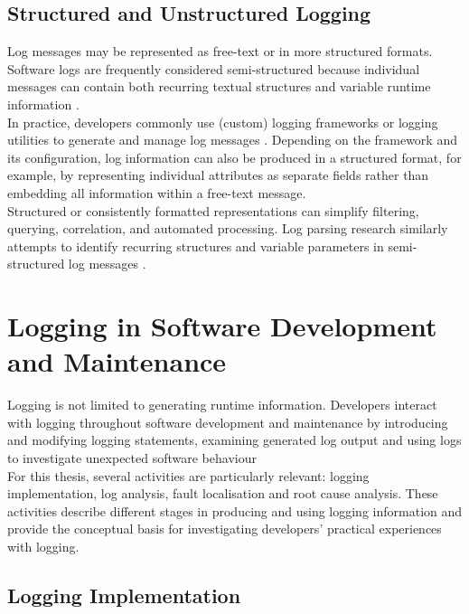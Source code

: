 \subsection{Structured and Unstructured Logging}
\label{subsec:structured_logging}

Log messages may be represented as free-text or in more structured formats. 
Software logs are frequently considered semi-structured because individual messages can contain both recurring textual structures 
and variable runtime information \cite{he2021asurveyonautomatedloganalysis,liu2022uniparser}.
\\
In practice, developers commonly use (custom) logging frameworks or logging utilities to generate and manage log messages \cite{chen2020studyingtheuseofjavaloggingutilities}. 
Depending on the framework and its configuration, log information can also be produced in a structured format, 
for example, by representing individual attributes as separate fields rather than embedding all information within a free-text message. 
\\
Structured or consistently formatted representations can simplify filtering, querying, correlation, and automated processing. 
Log parsing research similarly attempts to identify recurring structures and variable parameters in semi-structured 
log messages \cite{dai2022logram,zhu2019toolsandbenchmarksforautomatedlogparsing}.

\section{Logging in Software Development and Maintenance}
\label{sec:logging_development_maintenance}

Logging is not limited to generating runtime information. 
Developers interact with logging throughout software development and maintenance by introducing and modifying logging statements,
examining generated log output and using logs to investigate unexpected software 
behaviour \cite{yuan2012characterzingloggingpractices,chen2017characterizingloggingpractices}
\\
For this thesis, several activities are particularly relevant: logging implementation, log analysis, fault localisation
and root cause analysis. These activities describe different stages in producing and using logging information
and provide the conceptual basis for investigating developers' practical experiences with logging.

\subsection{Logging Implementation}
\label{subsec:logging_implementation}

